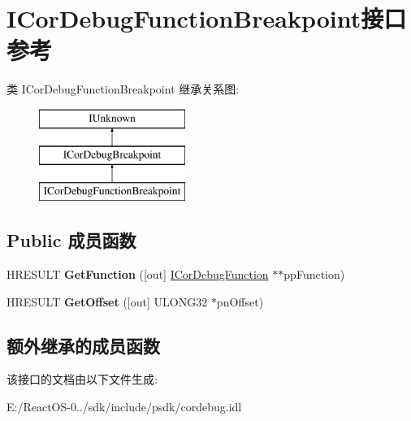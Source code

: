 \hypertarget{interface_i_cor_debug_function_breakpoint}{}\section{I\+Cor\+Debug\+Function\+Breakpoint接口 参考}
\label{interface_i_cor_debug_function_breakpoint}
类 I\+Cor\+Debug\+Function\+Breakpoint 继承关系图\+:\begin{figure}[H]
\begin{center}
\leavevmode
\includegraphics[height=3.000000cm]{interface_i_cor_debug_function_breakpoint}
\end{center}
\end{figure}
\subsection*{Public 成员函数}
\begin{DoxyCompactItemize}
\item 
\mbox{\label{interface_i_cor_debug_function_breakpoint_af2887124226917d7a151ae0681ec5065}} 
H\+R\+E\+S\+U\+LT {\bfseries Get\+Function} (\mbox{[}out\mbox{]} \hyperlink{interface_i_cor_debug_function}{I\+Cor\+Debug\+Function} $\ast$$\ast$pp\+Function)
\item 
\mbox{\label{interface_i_cor_debug_function_breakpoint_a25b5ada9a498993428a9b88452d319e8}} 
H\+R\+E\+S\+U\+LT {\bfseries Get\+Offset} (\mbox{[}out\mbox{]} U\+L\+O\+N\+G32 $\ast$pn\+Offset)
\end{DoxyCompactItemize}
\subsection*{额外继承的成员函数}


该接口的文档由以下文件生成\+:\begin{DoxyCompactItemize}
\item 
E\+:/\+React\+O\+S-\/0../sdk/include/psdk/cordebug.\+idl\end{DoxyCompactItemize}
